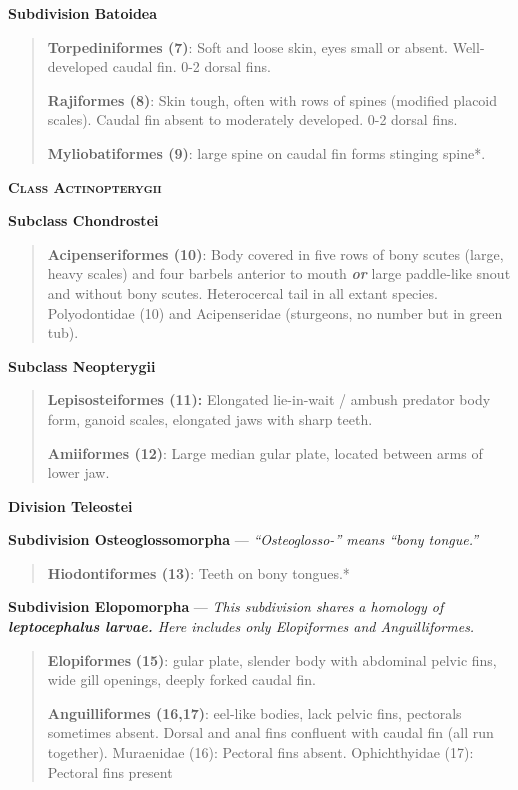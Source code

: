 \documentclass[12pt, hidelinks]{exam}
\begin{document}
\textbf{Subdivision Batoidea}

\begin{quote}
\textbf{Torpediniformes (7)}: Soft and loose skin, eyes small or absent.
Well-developed caudal fin. 0-2 dorsal fins.

\textbf{Rajiformes (8)}: Skin tough, often with rows of spines (modified
placoid scales). Caudal fin absent to moderately developed. 0-2 dorsal
fins.

\textbf{Myliobatiformes (9)}: large spine on caudal fin forms stinging
spine*.
\end{quote}

\textbf{\textsc{Class Actinopterygii}}

\textbf{Subclass Chondrostei}

\begin{quote}
\textbf{Acipenseriformes (10)}: Body covered in five rows of bony scutes
(large, heavy scales) and four barbels anterior to mouth
\emph{\textbf{or}} large paddle-like snout and without bony scutes.
Heterocercal tail in all extant species. Polyodontidae (10) and
Acipenseridae (sturgeons, no number but in green tub).
\end{quote}

\textbf{Subclass Neopterygii}


\begin{quote}
\textbf{Lepisosteiformes (11):} Elongated lie-in-wait / ambush predator
body form, ganoid scales, elongated jaws with sharp teeth.

\textbf{Amiiformes (12)}: Large median gular plate, located between arms
of lower jaw.
\end{quote}

\textbf{Division Teleostei}

\textbf{Subdivision Osteoglossomorpha} — \textit{“Osteoglosso-” means “bony tongue.”}

\begin{quote}
\textbf{Hiodontiformes (13)}: Teeth on bony tongues.*
\end{quote}

\textbf{Subdivision Elopomorpha} — \textit{This subdivision shares a homology of \textbf{leptocephalus larvae.} Here includes only Elopiformes and Anguilliformes.}

\begin{quote}
\textbf{Elopiformes} \textbf{(15)}: gular plate, slender body with
abdominal pelvic fins, wide gill openings, deeply forked caudal fin.

\textbf{Anguilliformes (16,17)}: eel-like bodies, lack pelvic fins,
pectorals sometimes absent. Dorsal and anal fins confluent with caudal
fin (all run together). Muraenidae (16): Pectoral fins absent.
Ophichthyidae (17): Pectoral fins present
\end{quote}
\end{document}
